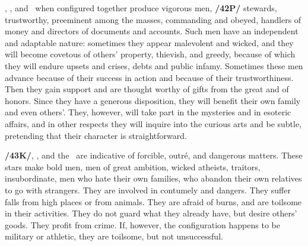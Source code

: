 \Saturn, \Jupiter, and \Mercury\, when configured together produce vigorous men, \textbf{/42P/} stewards, trustworthy, preeminent among the masses, commanding and obeyed, handlers of money and directors of documents and accounts. Such men have an independent and adaptable nature: sometimes they appear malevolent and wicked, and they will become covetous of others’ property, thievish, and greedy, because of which they will endure upsets and crises, debts and public infamy. Sometimes these men advance because of their success in action and because of their trustworthiness. Then they gain support and are thought worthy of gifts from the great and of honors. Since they have a generous disposition, they will benefit their own family and even others’. They, however, will take part in the mysteries and in esoteric affairs, and in other respects they will inquire into the curious arts and be subtle,  pretending that their character is straightforward.

\textbf{/43K/}\Saturn, \Mars, and the \Sun\, are indicative of forcible, outré, and dangerous matters. These stars make bold men, men of great ambition, wicked atheists, traitors, insubordinate, men who hate their own families, who abandon their own relatives to go with strangers. They are involved in contumely and dangers. They suffer falls from high places or from animals. They are afraid of burns, and are toilsome in their activities. They do not guard what they already have, but desire others’ goods. They profit from crime. If, however, the configuration happens to be military or athletic, they are toilsome, but not unsuccessful.

